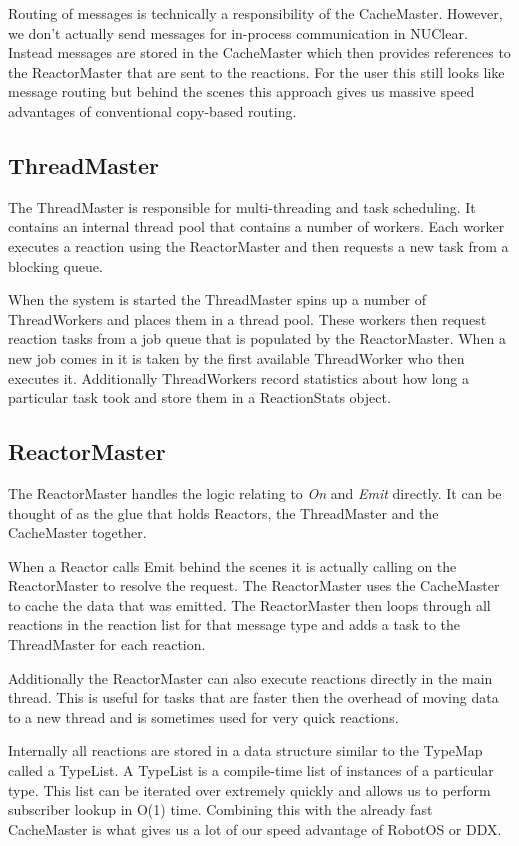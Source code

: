 \documentclass[english,12pt]{scrartcl}
\begin{document}
				Routing of messages is technically a responsibility of the CacheMaster.
				However, we don't actually send messages for in-process communication in NUClear. 
				Instead messages are stored in the CacheMaster which then provides references to the ReactorMaster that are sent to the reactions.
				For the user this still looks like message routing but behind the scenes this approach gives us massive speed advantages of conventional copy-based routing.

			\subsection{ThreadMaster}				
				The ThreadMaster is responsible for multi-threading and task scheduling.
				It contains an internal thread pool that contains a number of workers. 
				Each worker executes a reaction using the ReactorMaster and then requests a new task from a blocking queue.
				
				When the system is started the ThreadMaster spins up a number of ThreadWorkers and places them in a thread pool.
				These workers then request reaction tasks from a job queue that is populated by the ReactorMaster.
				When a new job comes in it is taken by the first available ThreadWorker who then executes it.
				Additionally ThreadWorkers record statistics about how long a particular task took and store them in a ReactionStats object.
	
			\subsection{ReactorMaster}
				The ReactorMaster handles the logic relating to \emph{On} and \emph{Emit} directly. 
				It can be thought of as the glue that holds Reactors, the ThreadMaster and the CacheMaster together.
				
				When a Reactor calls Emit behind the scenes it is actually calling on the ReactorMaster to resolve the request.
				The ReactorMaster uses the CacheMaster to cache the data that was emitted.
				The ReactorMaster then loops through all reactions in the reaction list for that message type and adds a task to the ThreadMaster for each reaction.
				
				Additionally the ReactorMaster can also execute reactions directly in the main thread. 
				This is useful for tasks that are faster then the overhead of moving data to a new thread and is sometimes used for very quick reactions.
			
				Internally all reactions are stored in a data structure similar to the TypeMap called a TypeList. 
				A TypeList is a compile-time list of instances of a particular type. This list can be iterated over extremely quickly and allows us to perform subscriber lookup in O(1) time.
				Combining this with the already fast CacheMaster is what gives us a lot of our speed advantage of RobotOS or DDX.
		
\end{document}
